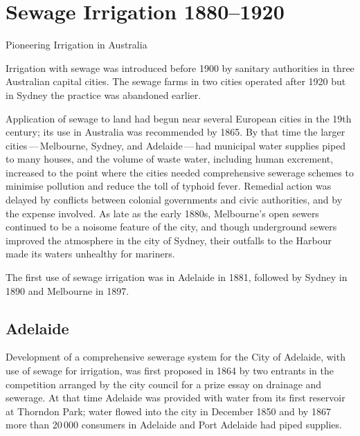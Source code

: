 
\setcounter{endnote}{0}

\chapter{Sewage Irrigation 1880--1920}
\label{ch:sewage}
%
{Pioneering Irrigation in Australia}

Irrigation with sewage was introduced before 1900 by sanitary
authorities in three Australian capital cities.  The sewage farms in
two cities operated after 1920 but in Sydney the practice was
abandoned earlier.

Application of sewage to land had begun near several European cities
in the 19th century; its use in Australia was recommended by 1865.  By
that time the larger cities\,---\,Melbourne, Sydney, and
Adelaide\,---\,had municipal water supplies piped to many houses, and
the volume of waste water, including human excrement, increased to the
point where the cities needed comprehensive sewerage schemes to
minimise pollution and reduce the toll of typhoid fever.  Remedial
action was delayed by conflicts between colonial governments and civic
authorities, and by the expense involved.  As late as the early 1880s,
Melbourne's open sewers continued to be a noisome feature of the city,
and though underground sewers improved the atmosphere in the city of
Sydney, their outfalls to the Harbour made its waters unhealthy for
mariners.

The first use of sewage irrigation was in Adelaide in 1881, followed
by Sydney in 1890 and Melbourne in 1897.

\section*{Adelaide}

Development of a comprehensive sewerage system for the City of
Adelaide, with use of sewage for irrigation, was first proposed in
1864 by two entrants in the competition arranged by the city council
for a prize essay on drainage and sewerage.  At that time Adelaide was
provided with water from its first reservoir at Thorndon Park;
 water flowed into the city in
December 1850 and by 1867 more than 20\,000 consumers in Adelaide and
Port Adelaide had piped
supplies.

